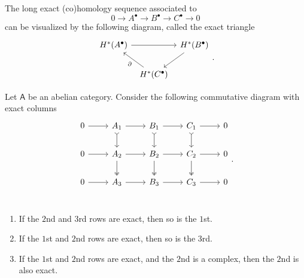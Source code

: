 \begin{rem}[Notation]
	The long exact (co)homology sequence associated to
	\begin{equation}
	0 \to A^\bullet \to B^\bullet \to C^\bullet \to 0
	\end{equation} 
	can be visualized by the following diagram, called the exact triangle
	\begin{equation}
	\begin{tikzcd}[column sep=tiny]
		H^*(A^\bullet) \arrow[rr, "", rightarrow] & &
		H^*(B^\bullet) \arrow[dl, "", rightarrow] \\
		&
		H^*(C^\bullet) \arrow[lu, "\partial", rightarrow] &
	\end{tikzcd}
	.\end{equation} 
\end{rem}

\begin{lem}
	Let $\mathsf{A}$ be an abelian category.
	Consider the following commutative diagram with exact columns
	\begin{equation}
	\begin{tikzcd}
		0 \arrow[r, "", rightarrow] &
		A_1 \arrow[r, "", rightarrow] \arrow[d, "", tail] &
		B_1 \arrow[r, "", rightarrow] \arrow[d, "", tail] &
		C_1 \arrow[r, "", rightarrow] \arrow[d, "", tail] &
		0 \\
		0 \arrow[r, "", rightarrow] &
		A_2 \arrow[r, "", rightarrow] \arrow[d, "", two heads] &
		B_2 \arrow[r, "", rightarrow] \arrow[d, "", two heads] &
		C_2 \arrow[r, "", rightarrow] \arrow[d, "", two heads] &
		0 \\
		0 \arrow[r, "", rightarrow] &
		A_3 \arrow[r, "", rightarrow] &
		B_3 \arrow[r, "", rightarrow] &
		C_3 \arrow[r, "", rightarrow] &
		0 \\
	\end{tikzcd}
	.\end{equation} 
	\begin{enumerate}
		\item If the $2$nd and $3$rd rows are exact, then so is the $1$st.
		\item If the $1$st and $2$nd rows are exact, then so is the $3$rd.
		\item If the $1$st and $2$nd rows are exact, and the $2$nd is a complex,
			then the $2$nd is also exact.
	\end{enumerate}
\end{lem} 

